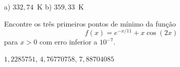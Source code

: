 \begin{Answer}
  \begin{tiny}
 a) $332,74$~K b) $359,33$~K    
  \end{tiny}
\end{Answer}

\begin{Exercise} Encontre os três primeiros pontos de mínimo da função $$f(x)=e^{-x/11}+x\cos(2x)$$ para $x>0$ com erro inferior a $10^{-7}$.
\end{Exercise}
\begin{Answer}
  \begin{tiny}
$1,2285751$, $4,76770758$, $7,88704085$
  \end{tiny}
\end{Answer}


% 
